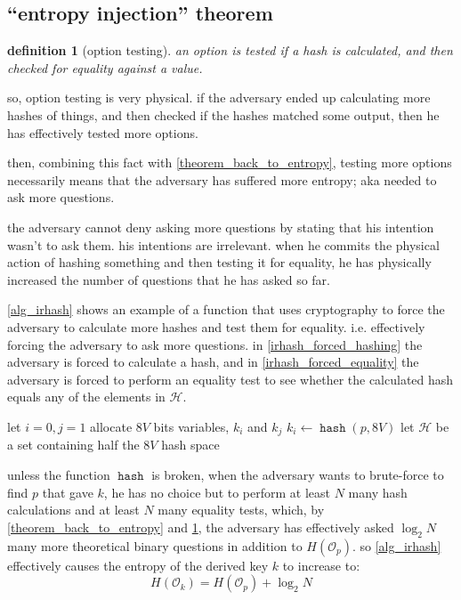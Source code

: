 \documentclass[twocolumn]{article}
\newtheorem{definition}{definition}
\DeclareMathOperator{\hash}{\mathtt{hash}}
\DeclareMathOperator{\irhash}{\mathtt{irhash}}
\begin{document}
\subsection{``entropy injection'' theorem}
\begin{definition}[option testing]\label{def_option_testing}
    an option is tested if a hash is calculated, and then checked for
    equality against a value.
\end{definition}

so, option testing is very physical.  if the adversary ended up calculating
more hashes of things, and then checked if the hashes matched some output,
then he has effectively tested more options.

then, combining this fact with \cref{theorem_back_to_entropy}, testing more
options necessarily means that the adversary has suffered more entropy; aka
needed to ask more questions.

the adversary cannot deny asking more questions by stating that his
intention wasn't to ask them.  his intentions are irrelevant.  when he
commits the physical action of hashing something and then testing it for
equality, he has physically increased the number of questions that he has
asked so far.

\cref{alg_irhash} shows an example of a function that uses cryptography to
force the adversary to calculate more hashes and test them for equality.
i.e.  effectively forcing the adversary to ask more questions.  in
\cref{irhash_forced_hashing} the adversary is forced to calculate a hash,
and in \cref{irhash_forced_equality} the adversary is forced to perform an
equality test to see whether the calculated hash equals any of the
elements in $\mathcal{H}$.

\begin{algorithm}
let $i=0, j=1$\;
allocate $8V$ bits variables, $k_i$ and $k_j$\;
$k_i \gets \hash(p, 8V)$\;
let $\mathcal{H}$ be a set containing half the $8V$ hash space\;
\For{$0, 1, \ldots, N-1$}{
    $k_j \gets \hash(k_i, 8V)$\;\label{irhash_forced_hashing}
    \If{$k_j \in \mathcal{H}$}{\label{irhash_forced_equality}
        $k_j \gets k_j + 1$\;
    }
    $\hat i \gets i$\;
    $i \gets j$\;
    $j \gets \hat i$\;
}
\caption{$\irhash(p, 8V, N)$}
\label{alg_irhash}
\end{algorithm}

unless the function $\hash$ is broken, when the adversary wants to
brute-force to find $p$ that gave $k$, he has no choice but to perform at
least $N$ many hash calculations and at least $N$ many equality tests,
which, by \cref{theorem_back_to_entropy} and \cref{def_option_testing}, the
adversary has effectively asked $\log_2 N$ many more theoretical binary
questions in addition to $H(\mathcal{O}_p)$.  so \cref{alg_irhash}
effectively causes the entropy of the derived key $k$ to increase to:
\begin{equation}
    H(\mathcal{O}_k) = H(\mathcal{O}_p) + \log_2 N
\end{equation}
\end{document}
